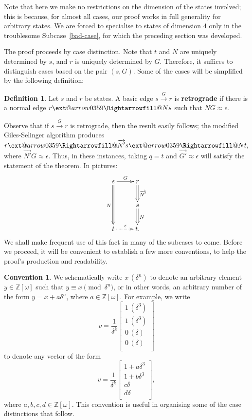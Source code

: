 \documentclass{dalthesis}
\makeatletter
\theoremstyle{theorem}
\theoremstyle{definition}
\newtheorem{definition}[theorem]{Definition}
\theoremstyle{definition}  %
\theoremstyle{definition}
\newtheorem{convention}{Convention}
\newcommand{\Z}{\mathbb{Z}}
\renewcommand{\:}{\mathbin{:}}
\newcommand{\xRightarrow}[2][]{\ext@arrow
  0359\Rightarrowfill@{#1}{#2}}
\newcommand{\edge}{\xrightarrow}
\newcommand{\nedge}{\xRightarrow}
\renewcommand{\vec}{\overrightarrow}
\makeatother
\begin{document}
   Note that here we make no restrictions on the dimension of the states involved; this is because, for almost all cases, our proof works in full generality for arbitrary states. We are forced to specialise to states of dimension $4$ only in the troublesome Subcase~\ref{bad-case}, for which the preceding section was developed.
   
   The proof proceeds by case distinction. Note that $t$ and $N$ are uniquely determined by $s$, and $r$ is uniquely determined by $G$. Therefore, it suffices to distinguish cases based on the pair $(s,G)$. Some of the cases will be simplified by the following definition:
  
\begin{definition}
\label{RetroEdgeDef}
Let $s$ and $r$ be states. A basic edge $s\edge{G}r$ is \textbf{retrograde} if there is a normal edge $r\nedge{N}s$ such that $NG\approx\epsilon.$
\end{definition}
    
  Observe that if $s\edge{G}r$ is retrograde, then the result easily follows; the modified Giles-Selinger algorithm produces $r\nedge{\vec{N'}}s\nedge{N}t,$ where $\vec{N'}G\approx\epsilon.$ Thus, in these instances, taking $q = t$ and $\vec{G'}\approx\epsilon$ will satisfy the statement of the theorem. In pictures: \[ \xymatrix{
    s \ar@{=>}[dd]_{N}
     \ar[r]^{G} &
    r \ar@{=>}[d]^{\vec{N'}} \\
    &s\ar@{=>}[d]^{N} \\
    t \ar@{.>}[r]^{\epsilon} &
    t.
  }
  \]
 We shall make frequent use of this fact in many of the subcases to come. Before we proceed, it will be convenient to establish a few more conventions, to help the proof's production and readability.

\begin{convention}
\label{ModConv}
  We schematically write $x\,(\delta^n)$ to denote an arbitrary
  element $y\in\Z[\omega]$ such that $y\equiv x\pmod{\delta^n}$, or in
  other words, an arbitrary number of the form $y=x+a\delta^n$, where
  $a\in\Z[\omega]$. For example, we write
  \[ v = \frac{1}{\delta^k}\begin{bmatrix}
    1\,(\delta^3)\\
    1\,(\delta^3)\\
    0\,(\delta)\\
    0\,(\delta)\\
  \end{bmatrix}
  \]
  to denote any vector of the form
  \[ v = \frac{1}{\delta^k}\begin{bmatrix}
    1 + a\delta^3\\
    1 + b\delta^3\\
    c\delta\\
    d\delta\\
  \end{bmatrix},
  \]
  where $a,b,c,d\in\Z[\omega]$. This convention is useful in
  organising some of the case distinctions that follow.
\end{convention}
\end{document}
